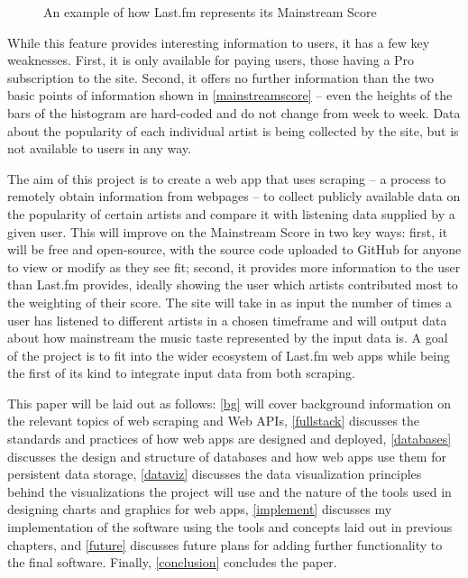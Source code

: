 \begin{figure}[!ht]
	\begin{center}
		\caption{An example of how Last.fm represents its Mainstream Score}\label{mainstreamscore}
	\end{center}
\end{figure}

While this feature provides interesting information to users, it has a few key weaknesses. First, it is only available for paying users, those having a Pro subscription to the site. Second, it offers no further information than the two basic points of information shown in \autoref{mainstreamscore} -- even the heights of the bars of the histogram are hard-coded and do not change from week to week. Data about the popularity of each individual artist is being collected by the site, but is not available to users in any way.

The aim of this project is to create a web app that uses scraping -- a process to remotely obtain information from webpages -- to collect publicly available data on the popularity of certain artists and compare it with listening data supplied by a given user. This will improve on the Mainstream Score in two key ways: first, it will be free and open-source, with the source code uploaded to GitHub for anyone to view or modify as they see fit; second, it provides more information to the user than Last.fm provides, ideally showing the user which artists contributed most to the weighting of their score. The site will take in as input the number of times a user has listened to different artists in a chosen timeframe and will output data about how mainstream the music taste represented by the input data is. A goal of the project is to fit into the wider ecosystem of Last.fm web apps while being the first of its kind to integrate input data from both scraping.

This paper will be laid out as follows: \autoref{bg} will cover background information on the relevant topics of web scraping and Web APIs, \autoref{fullstack} discusses the standards and practices of how web apps are designed and deployed, \autoref{databases} discusses the design and structure of databases and how web apps use them for persistent data storage, \autoref{dataviz} discusses the data visualization principles behind the visualizations the project will use and the nature of the tools used in designing charts and graphics for web apps, \autoref{implement} discusses my implementation of the software using the tools and concepts laid out in previous chapters, and \autoref{future} discusses future plans for adding further functionality to the final software. Finally, \autoref{conclusion} concludes the paper.